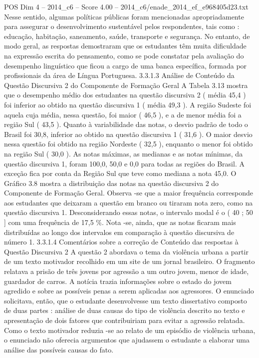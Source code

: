 \begin{textsample}{POS Dim 4 – 2014\_c6 – Score 4.00 – 2014\_c6/enade\_2014\_ef\_e968405d23.txt}
Nesse sentido, algumas políticas públicas foram mencionadas apropriadamente para assegurar o desenvolvimento sustentável pelos respondentes, tais como : educação, habitação, saneamento, saúde, transporte e segurança.
No entanto, de modo geral, as respostas demostraram que os estudantes têm muita dificuldade na expressão escrita do pensamento, como se pode constatar pela avaliação do desempenho linguístico que ficou a cargo de uma banca específica, formada por profissionais da área de Língua Portuguesa. 3.3.1.3 Análise de Conteúdo da Questão Discursiva 2 do Componente de Formação Geral A Tabela 3.13 mostra que o desempenho médio dos estudantes na questão discursiva 2 ( média 45,4 ) foi inferior ao obtido na questão discursiva 1 ( média 49,3 ).
A região Sudeste foi aquela cuja média, nessa questão, foi maior ( 46,5 ), e a de menor média foi a região Sul ( 43,5 ).
Quanto à variabilidade das notas, o desvio padrão de todo o Brasil foi 30,8, inferior ao obtido na questão discursiva 1 ( 31,6 ).
O maior desvio nessa questão foi obtido na região Nordeste ( 32,5 ), enquanto o menor foi obtido na região Sul ( 30,0 ).
As notas máximas, as medianas e as notas mínimas, da questão discursiva 1, foram 100,0, 50,0 e 0,0 para todas as regiões do Brasil.
A exceção fica por conta da Região Sul que teve como mediana a nota 45,0.
O Gráfico 3.8 mostra a distribuição das notas na questão discursiva 2 do Componente de Formação Geral.
Observa -se que a maior frequência corresponde aos estudantes que deixaram a questão em branco ou tiraram nota zero, como na questão discursiva 1.
Desconsiderando essas notas, o intervalo modal é o ( 40 ; 50 ] com uma frequência de 17,5 \%.
Nota -se, ainda, que as notas ficaram mais distribuídas ao longo dos intervalos em comparação à questão discursiva de número 1. 3.3.1.4 Comentários sobre a correção de Conteúdo das respostas à Questão Discursiva 2 A questão 2 abordava o tema da violência urbana a partir de um texto motivador recolhido em um site de um jornal brasileiro.
O fragmento relatava a prisão de três jovens por agressão a um outro jovem, menor de idade, guardador de carros.
A notícia trazia informações sobre o estado do jovem agredido e sobre as possíveis penas a serem aplicadas aos agressores.
O enunciado solicitava, então, que o estudante desenvolvesse um texto dissertativo composto de duas partes : análise de duas causas do tipo de violência descrito no texto e apresentação de dois fatores que contribuiriam para evitar a agressão relatada.
Como o texto motivador reduzia -se ao relato de um episódio de violência urbana, o enunciado não oferecia argumentos que ajudassem o estudante a elaborar uma análise das possíveis causas do fato.

\end{textsample}
